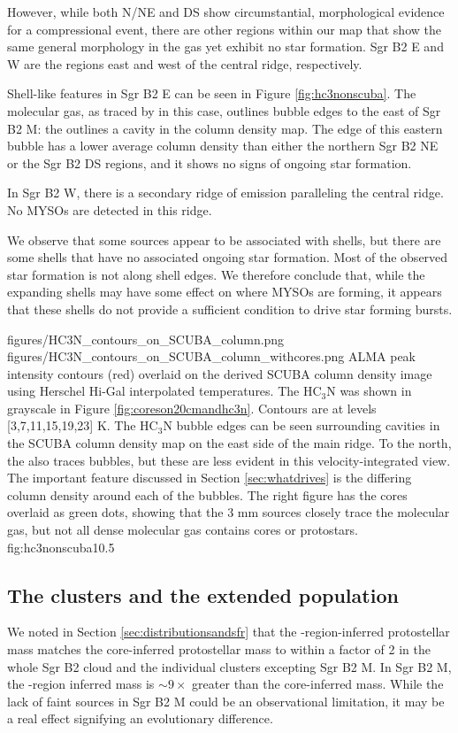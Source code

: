 \documentclass[twocolumn]{aastex61}
\begin{document}
However, while both N/NE and DS show circumstantial, morphological evidence
for a compressional event, there are other regions within our map that show
the same general morphology in the gas yet exhibit no star formation.
Sgr B2 E and W are the regions east and west of the central ridge, respectively.

Shell-like features in Sgr B2 E can be seen in Figure \ref{fig:hc3nonscuba}.
The molecular gas, as traced by \cyanoacetylene in this case, outlines bubble edges to
the east of Sgr B2 M: the \cyanoacetylene outlines a cavity in the column density map.
The edge of this eastern bubble has a lower average column density than either
the northern Sgr B2 NE or the Sgr B2 DS regions, and it shows no signs of
ongoing star formation. 

In Sgr B2 W, there is a secondary ridge of \cyanoacetylene emission paralleling
the central ridge.  No MYSOs are detected in this ridge.


We observe that some sources appear to be associated with shells, but there are
some shells that have no associated ongoing star formation.  Most of the
observed star formation is not along shell edges.  We therefore conclude that,
while the expanding shells may have some effect on where MYSOs are forming, it
appears that these shells do not provide a sufficient condition to drive star
forming bursts.


\FigureTwo
{figures/HC3N_contours_on_SCUBA_column.png}
{figures/HC3N_contours_on_SCUBA_column_withcores.png}
{ALMA \cyanoacetylene peak intensity contours (red) overlaid on the derived SCUBA
column density
image using Herschel Hi-Gal interpolated temperatures. The HC$_3$N was
shown in grayscale in Figure \ref{fig:coreson20cmandhc3n}.
Contours are at levels [3,7,11,15,19,23] K.  The  HC$_3$N bubble edges can be
seen surrounding cavities in the SCUBA column density map on the east side of
the main ridge.  To the north, the \cyanoacetylene also traces bubbles, but these are
less evident in this velocity-integrated view.  The important feature discussed
in Section \ref{sec:whatdrives} is the differing column density around each of
the bubbles.  The right figure has the cores overlaid as green dots,
showing that the 3 mm sources closely trace the molecular gas, but not all
dense molecular gas contains cores or protostars.}
{fig:hc3nonscuba}{1}{0.5\textwidth}

\subsection{The clusters and the extended population}
\label{sec:clustersandextended}
We noted in Section \ref{sec:distributionsandsfr} that the \hii-region-inferred
protostellar mass matches the core-inferred protostellar mass to within a
factor of 2 in the whole Sgr B2 cloud and the individual clusters excepting Sgr
B2 M.  In Sgr B2 M, the \hii-region inferred mass is $\sim9\times$ greater than
the core-inferred mass.  While the lack of faint sources in Sgr B2 M could
be an observational limitation, it may be a real effect signifying an evolutionary
difference.
\end{document}

